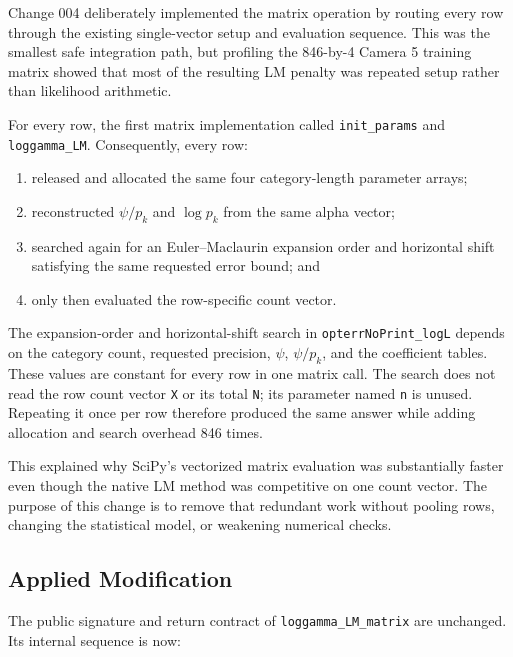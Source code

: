 \documentclass[11pt,a4paper]{article}
\begin{document}
Change 004 deliberately implemented the matrix operation by routing every row
through the existing single-vector setup and evaluation sequence. This was the
smallest safe integration path, but profiling the 846-by-4 Camera 5 training
matrix showed that most of the resulting LM penalty was repeated setup rather
than likelihood arithmetic.

For every row, the first matrix implementation called \texttt{init\_params} and
\texttt{loggamma\_LM}. Consequently, every row:

\begin{enumerate}

\item released and allocated the same four category-length parameter arrays;

\item reconstructed \(\psi/p_k\) and \(\log p_k\) from the same alpha vector;

\item searched again for an Euler--Maclaurin expansion order and horizontal
shift satisfying the same requested error bound; and

\item only then evaluated the row-specific count vector.

\end{enumerate}

The expansion-order and horizontal-shift search in
\texttt{opterrNoPrint\_logL} depends on the category count, requested
precision, \(\psi\), \(\psi/p_k\), and the coefficient tables. These values are
constant for every row in one matrix call. The search does not read the row
count vector \texttt{X} or its total \texttt{N}; its parameter named
\texttt{n} is unused. Repeating it once per row therefore produced the same
answer while adding allocation and search overhead 846 times.

This explained why SciPy's vectorized matrix evaluation was substantially
faster even though the native LM method was competitive on one count vector.
The purpose of this change is to remove that redundant work without pooling
rows, changing the statistical model, or weakening numerical checks.

\subsection{Applied Modification}

The public signature and return contract of \texttt{loggamma\_LM\_matrix} are
unchanged. Its internal sequence is now:
\end{document}
